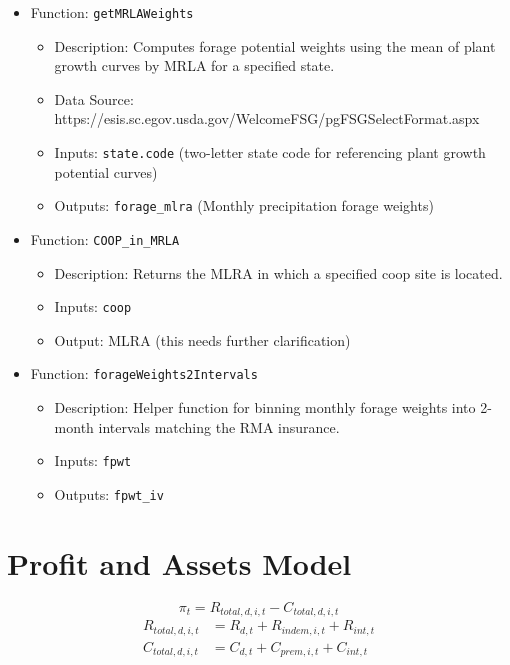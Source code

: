\documentclass[11pt]{article}
\begin{document}
\begin{itemize}
\item Function: \verb!getMRLAWeights!
	\begin{itemize}
	\item Description: Computes forage potential weights using the mean of plant growth curves by MRLA for a specified state.
	\item Data Source: https://esis.sc.egov.usda.gov/WelcomeFSG/pgFSGSelectFormat.aspx
	\item Inputs: \verb!state.code! (two-letter state code for referencing
  plant growth potential curves)
  \item Outputs: \verb!forage_mlra! (Monthly precipitation forage weights)
	\end{itemize}
\end{itemize}

\begin{itemize}
\item Function: \verb!COOP_in_MRLA!
	\begin{itemize}
	\item Description: Returns the MLRA in which a specified coop site is located.
	\item Inputs: \verb!coop!
	\item Output: MLRA (this needs further clarification)
	\end{itemize}
\end{itemize}

\begin{itemize}
\item Function: \verb!forageWeights2Intervals!
	\begin{itemize}
	\item Description: Helper function for binning monthly forage weights into 2-month intervals matching the RMA insurance.
	\item Inputs: \verb!fpwt!
	\item Outputs: \verb!fpwt_iv!
	\end{itemize}
\end{itemize}

\section{Profit and Assets Model}
	\begin{equation}
	\pi_t = R_{total,d,i,t} - C_{total,d,i,t}
	\end{equation}
	\begin{align}
	R_{total,d,i,t} &= R_{d,t} +  R_{indem,i,t} + R_{int,t} \\
	C_{total,d,i,t} &= C_{d,t} + C_{prem,i,t} + C_{int,t}
	\end{align}
\end{document}
